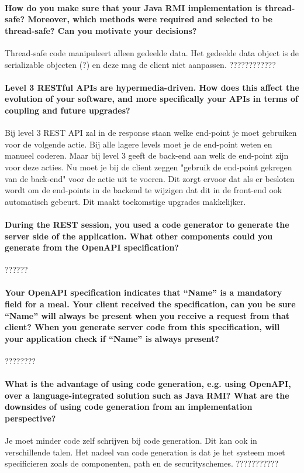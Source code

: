 \documentclass{ds-report}
\begin{document}
    \paragraph{How do you make sure that your Java RMI implementation is thread-safe? Moreover, which methods were required and selected to be thread-safe? Can you motivate your decisions?}
    Thread-safe code manipuleert alleen gedeelde data. Het gedeelde data object is de serializable objecten (?) en deze mag de client niet aanpassen. ????????????
    
    \paragraph{Level 3 RESTful APIs are hypermedia-driven. How does this affect the evolution of your software, and more specifically your APIs in terms of coupling and future upgrades?}
    Bij level 3 REST API zal in de response staan welke end-point je moet gebruiken voor de volgende actie. Bij alle lagere levels moet je de end-point weten en manueel coderen. Maar bij level 3 geeft de back-end aan welk de end-point zijn voor deze acties. Nu moet je bij de client zeggen "gebruik de end-point gekregen van de back-end" voor de actie uit te voeren. Dit zorgt ervoor dat als er besloten wordt om de end-points in de backend te wijzigen dat dit in de front-end ook automatisch gebeurt. Dit maakt toekomstige upgrades makkelijker.

    \paragraph{During the REST session, you used a code generator to generate the server side of the application. What other components could you generate from the OpenAPI specification? }
    ??????

    \paragraph{Your OpenAPI specification indicates that “Name” is a mandatory field for a meal. Your client received the specification, can you be sure “Name” will always be present when you receive a request from that client? When you generate server code from this specification, will your application check if “Name” is always present? }
    ????????

    \paragraph{What is the advantage of using code generation, e.g. using OpenAPI, over a language-integrated solution such as Java RMI? What are the downsides of using code generation from an implementation perspective?}
    Je moet minder code zelf schrijven bij code generation. Dit kan ook in verschillende talen. Het nadeel van code generation is dat je het systeem moet specificieren zoals de componenten, path en de securityschemes. ???????????
\end{document}
